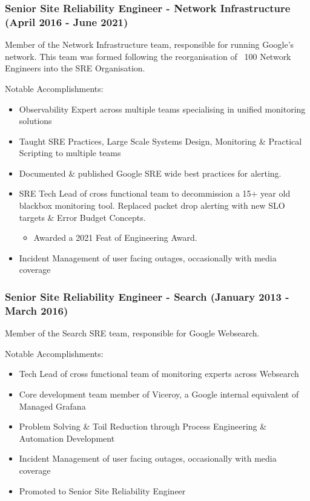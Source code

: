 \documentclass[a4paper, 10pt] {article}
\begin{document}
\subsubsection*{Senior Site Reliability Engineer - Network Infrastructure (April 2016 - June 2021)}

Member of the Network Infrastructure team, responsible for running Google's network. This team was formed
following the reorganisation of ~100 Network Engineers into the SRE Organisation.

\vspace{3mm}  %

Notable Accomplishments:

\begin{itemize}
  \item Observability Expert across multiple teams specialising in unified monitoring solutions
  \item Taught SRE Practices, Large Scale Systems Design, Monitoring \& Practical Scripting to multiple teams
  \item Documented \& published Google SRE wide best practices for alerting.
  \item SRE Tech Lead of cross functional team to decommission a 15+ year old blackbox monitoring tool. Replaced packet drop alerting with new SLO targets \& Error Budget Concepts.
  \begin{itemize}
     \item Awarded a 2021 Feat of Engineering Award.
  \end{itemize}
  \item Incident Management of user facing outages, occasionally with media coverage
\end{itemize}

\subsubsection*{Senior Site Reliability Engineer - Search (January 2013 - March 2016)}

Member of the Search SRE team, responsible for Google Websearch.

\vspace{3mm}  %

Notable Accomplishments:

\begin{itemize}
  \item Tech Lead of cross functional team of monitoring experts across Websearch
  \item Core development team member of Viceroy, a Google internal equivalent of Managed Grafana
  \item Problem Solving \& Toil Reduction through Process Engineering \& Automation Development
  \item Incident Management of user facing outages, occasionally with media coverage
  \item Promoted to Senior Site Reliability Engineer
\end{itemize}
\end{document}
